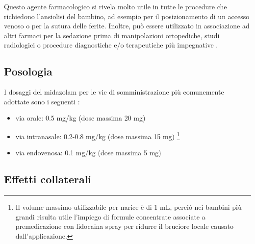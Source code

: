 Questo agente farmacologico si rivela molto utile in tutte le procedure che richiedono l'ansiolisi del bambino, ad esempio per il posizionamento di un accesso venoso o per la sutura delle ferite. Inoltre, può essere utilizzato in associazione ad altri farmaci per la sedazione prima di manipolazioni ortopediche, studi radiologici o procedure diagnostiche e/o terapeutiche più impegnative \cite{Simeupsedazione, Olkkola2008}. 

\subsection*{Posologia}

I dosaggi del midazolam per le vie di somministrazione più comunemente adottate sono i seguenti \cite{Simeupsedazione}: 
\begin{itemize}
    \item via orale: 0.5 mg/kg (dose massima 20 mg)
    \item via intranasale: 0.2-0.8 mg/kg (dose massima 15 mg) \footnote{Il volume massimo utilizzabile per narice è di 1 mL, perciò nei bambini più grandi risulta utile l'impiego di formule concentrate associate a premedicazione con lidocaina spray per ridurre il bruciore locale causato dall'applicazione.}
    \item via endovenosa: 0.1 mg/kg (dose massima 5 mg)
\end{itemize}

\subsection*{Effetti collaterali}

